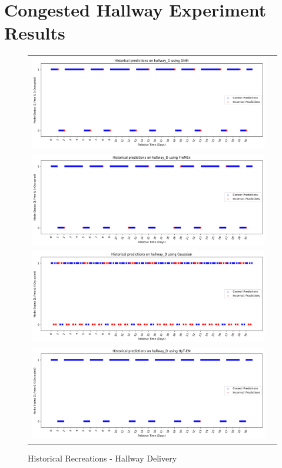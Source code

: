 


  \chapter{ Congested Hallway Experiment Results }

\begin{figure}[!Hp]
  \begin{tabular}{cc}
    {\includegraphics[width = 6in]{images/results/Historical_hallway_D_DMM.png}} \\
    {\includegraphics[width = 6in]{images/results/Historical_hallway_D_FreMEn.png}} \\
    {\includegraphics[width = 6in]{images/results/Historical_hallway_D_Gaussian.png}} \\
    {\includegraphics[width = 6in]{images/results/Historical_hallway_D_HyT-EM.png}} \\
  \end{tabular}
  \caption{Historical Recreations - Hallway Delivery}
\end{figure}\\ \\

